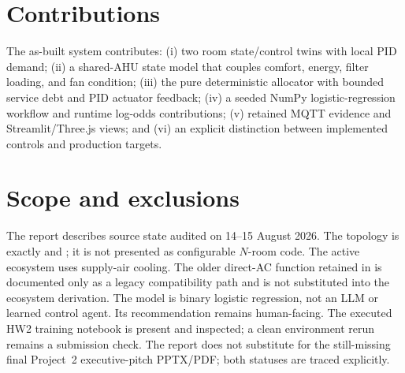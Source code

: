 \section{Contributions}
The as-built system contributes: (i) two room state/control twins with local PID demand; (ii) a shared-AHU state model that couples comfort, energy, filter loading, and fan condition; (iii) the pure deterministic  allocator with bounded service debt and PID actuator feedback; (iv) a seeded NumPy logistic-regression workflow and runtime log-odds contributions; (v) retained MQTT evidence and Streamlit/Three.js views; and (vi) an explicit distinction between implemented controls and production targets.

\section{Scope and exclusions}
The report describes source state audited on 14--15 August 2026. The topology is exactly  and ; it is not presented as configurable $N$-room code. The active ecosystem uses supply-air cooling. The older direct-AC function retained in  is documented only as a legacy compatibility path and is not substituted into the ecosystem derivation. The model is binary logistic regression, not an LLM or learned control agent. Its recommendation remains human-facing. The executed HW2 training notebook is present and inspected; a clean environment rerun remains a submission check. The report does not substitute for the still-missing final Project~2 executive-pitch PPTX/PDF; both statuses are traced explicitly.
